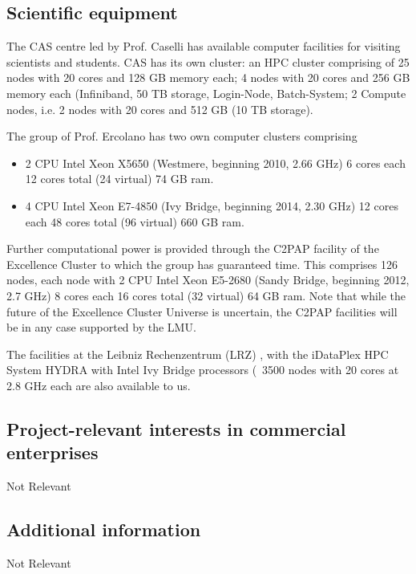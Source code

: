 \documentclass[10pt,fleqn,twoside]{article}
\newcommand{\Tcol}{\color{blue}}
\begin{document}
\subsection{\Tcol Scientific equipment}

The CAS centre led by Prof. Caselli has available computer facilities for visiting scientists and students. CAS has its own cluster: an HPC cluster comprising of 25 nodes with 20 cores and 128 GB memory each; 4 nodes with 20 cores and 256 GB memory each (Infiniband, 50 TB storage, Login-Node, Batch-System; 2 Compute nodes, i.e. 2 nodes with 20 cores and 512 GB (10 TB storage). 


The group of Prof. Ercolano has two own computer clusters comprising 

\begin{itemize}
\item 2 CPU Intel Xeon X5650 (Westmere, beginning
2010, 2.66 GHz) 6 cores each 12 cores total (24 virtual) 74 GB ram.

\item 4 CPU Intel Xeon E7-4850 (Ivy Bridge, beginning 2014, 2.30 GHz)
12 cores each 48 cores total (96 virtual) 660 GB ram.

\end{itemize}

Further computational power is provided through the C2PAP facility of the Excellence Cluster to which
the group has guaranteed time. This comprises 126 nodes, each node with 2 CPU Intel Xeon E5-2680 (Sandy
Bridge, beginning 2012, 2.7 GHz) 8 cores each 16 cores total (32
virtual) 64 GB ram. Note that while the future of the Excellence
Cluster Universe is uncertain, the C2PAP facilities will be in any
case supported by the LMU. 

The facilities at the Leibniz Rechenzentrum (LRZ) , with the iDataPlex
HPC System HYDRA with Intel Ivy Bridge processors (~3500 nodes with 20
cores at 2.8 GHz each are also available to us.

\subsection{\Tcol Project-relevant interests in commercial enterprises}

Not Relevant


\subsection{\Tcol Additional information}

Not Relevant
\end{document}
